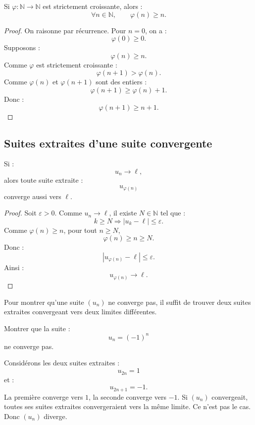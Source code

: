 \documentclass[11pt,a4paper]{article}
\newcommand{\N}{\mathbb N}
\newcommand{\abs}[1]{\left|#1\right|}
\newcommand{\implique}{\Longrightarrow}
\begin{document}
\begin{theorembox}
Si \(\varphi:\N\to\N\) est strictement croissante, alors :
\[
\forall n\in\N,\qquad \varphi(n)\geq n.
\]
\end{theorembox}

\begin{proof}
On raisonne par récurrence.  
Pour \(n=0\), on a :
\[
\varphi(0)\geq0.
\]
Supposons :
\[
\varphi(n)\geq n.
\]
Comme \(\varphi\) est strictement croissante :
\[
\varphi(n+1)>\varphi(n).
\]
Comme \(\varphi(n)\) et \(\varphi(n+1)\) sont des entiers :
\[
\varphi(n+1)\geq\varphi(n)+1.
\]
Donc :
\[
\varphi(n+1)\geq n+1.
\]
\end{proof}

\subsection{Suites extraites d'une suite convergente}

\begin{theorembox}
Si :
\[
u_n\to\ell,
\]
alors toute suite extraite :
\[
u_{\varphi(n)}
\]
converge aussi vers \(\ell\).
\end{theorembox}

\begin{proof}
Soit \(\varepsilon>0\).  
Comme \(u_n\to\ell\), il existe \(N\in\N\) tel que :
\[
k\geq N\implique \abs{u_k-\ell}\leq\varepsilon.
\]
Comme \(\varphi(n)\geq n\), pour tout \(n\geq N\),
\[
\varphi(n)\geq n\geq N.
\]
Donc :
\[
\abs{u_{\varphi(n)}-\ell}\leq\varepsilon.
\]
Ainsi :
\[
u_{\varphi(n)}\to\ell.
\]
\end{proof}

\begin{methodbox}
Pour montrer qu'une suite \((u_n)\) ne converge pas, il suffit de trouver deux suites extraites convergeant vers deux limites différentes.
\end{methodbox}

\begin{exercicebox}
Montrer que la suite :
\[
u_n=(-1)^n
\]
ne converge pas.
\end{exercicebox}

\begin{correctionbox}
Considérons les deux suites extraites :
\[
u_{2n}=1
\]
et :
\[
u_{2n+1}=-1.
\]
La première converge vers \(1\), la seconde converge vers \(-1\).  
Si \((u_n)\) convergeait, toutes ses suites extraites convergeraient vers la même limite.  
Ce n'est pas le cas.  
Donc \((u_n)\) diverge.
\end{correctionbox}
\end{document}
